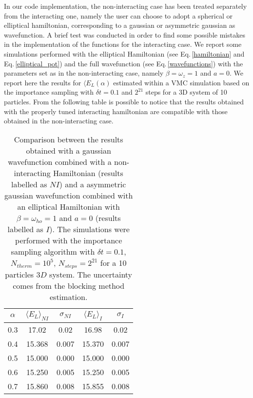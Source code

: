 In our code implementation, the non-interacting case has been treated separately from the interacting one, namely the user can choose to adopt a spherical or elliptical hamiltonian, corresponding to a gaussian or asymmetric gaussian as wavefunction. A brief test was conducted in order to find some possible mistakes in the implementation of the functions for the interacting case. We report some simulations performed with the elliptical Hamiltonian (see Eq.\,\ref{hamiltonian} and Eq.\,\ref{elliptical_pot}) and the full wavefunction (see Eq.\,\ref{wavefunctions}) with the parameters set as in the non-interacting case, namely $\beta=\omega_z=1$ and $a=0$. We report here the results for $\langle E_L(\alpha)$ estimated within a VMC simulation based on the importance sampling with $\delta t = 0.1$ and $2^{21}$ steps for a 3D system of 10 particles. From the following table is possible to notice that the results obtained with the properly tuned interacting hamiltonian are compatible with those obtained in the non-interacting case.  

\begin{table}[h!]
    \centering
    \begin{tabular}{ccccc}
        \toprule
        $\alpha$ & $\langle E_L \rangle_{\textit{NI}}$ & $\sigma_{NI}$ & $\langle E_L \rangle_{\textit{I}}$ & $\sigma_{I}$  \\
        \midrule
        0.3 & 17.02  & 0.02 & 16.98 & 0.02 \\
        0.4 & 15.368 & 0.007 & 15.370 & 0.007 \\
        0.5 & 15.000 & 0.000 & 15.000 & 0.000 \\
        0.6 & 15.250 & 0.005 & 15.250 & 0.005 \\
        0.7 & 15.860 & 0.008 & 15.855 & 0.008 \\
        \bottomrule
    \end{tabular}
    \caption{Comparison between the results obtained with a gaussian wavefunction combined with a non-interacting Hamiltonian (results labelled as $NI$) and a asymmetric gaussian wavefunction combined with an elliptical Hamiltonian with $\beta=\omega_{ho}=1$ and $a=0$ (results labelled as $I$). The simulations were performed with the importance sampling algorithm with $\delta t=0.1$, $N_{therm}=10^5$, $N_{steps}=2^{21}$ for a 10 particles $3D$ system. The uncertainty comes from the blocking method estimation. }
    \label{tab:matching between int case and non int}
\end{table}
\vfill\null